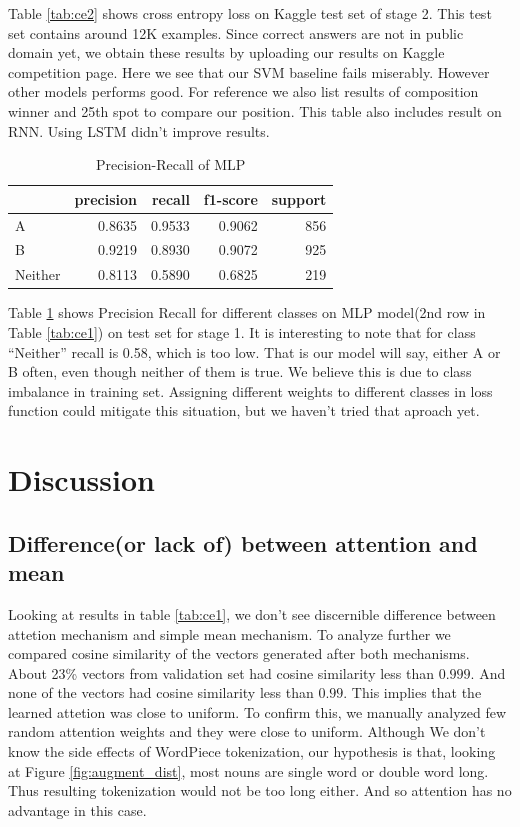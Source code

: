 \documentclass[11pt,a4paper]{article}
\begin{document}
Table \ref{tab:ce2} shows cross entropy loss on Kaggle test set of stage 2. This test set contains around 12K examples. Since correct answers are not in public domain yet, we obtain these results by uploading our results on Kaggle competition page. Here we see that our SVM baseline fails miserably. However other models performs good. For reference we also list results of composition winner and 25th spot to compare our position. This table also includes result on RNN. Using LSTM didn't improve results.

\begin{table}
  \centering
  \begin{tabular}{|l|r|r|r|r|}
    \hline
    &    precision&    recall&  f1-score&    support \\
    \hline
    A&     0.8635&    0.9533&    0.9062&       856\\
    B&     0.9219&    0.8930&    0.9072&       925\\
    Neither&     0.8113&    0.5890&    0.6825&       219\\
    \hline

  \end{tabular}
  \caption{Precision-Recall of MLP}
  \label{tab:precisionrecall}
\end{table}

Table \ref{tab:precisionrecall} shows Precision Recall for different classes on MLP model(2nd row in Table \ref{tab:ce1}) on test set for stage 1. It is interesting to note that for class ``Neither'' recall is 0.58, which is too low. That is our model will say, either A or B often, even though neither of them is true. We believe this is due to class imbalance in training set. Assigning different weights to different classes in loss function could mitigate this situation, but we haven't tried that aproach yet.

\section{Discussion}
\label{sec:discussion}

\subsection{Difference(or lack of) between attention and mean}
Looking at results in table \ref{tab:ce1}, we don't see discernible difference between attetion mechanism and simple mean mechanism. To analyze further we compared cosine similarity of the vectors generated after both mechanisms. About 23\% vectors from validation set had cosine similarity less than $0.999$. And none of the vectors had cosine similarity less than $0.99$. This implies that the learned attetion was close to uniform. To confirm this,  we manually analyzed few random attention weights and they were close to uniform. Although We don't know the side effects of WordPiece tokenization, our hypothesis is that, looking at Figure \ref{fig:augment_dist}, most nouns are single word or double word long. Thus resulting tokenization would not be too long either. And so attention has no advantage in this case.
\end{document}
